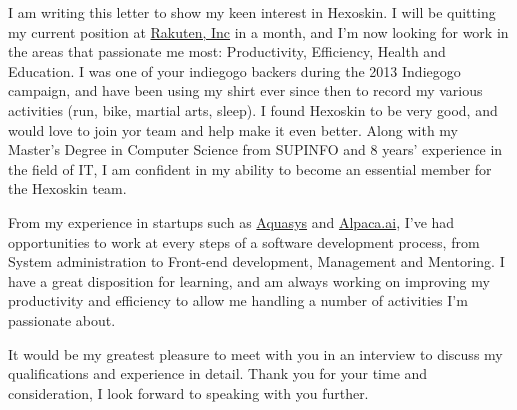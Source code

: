 \documentclass[10pt,stdletter,dateno,sigleft]{newlfm} %
\begin{document}
\begin{newlfm}


I am writing this letter to show my keen interest in Hexoskin. I will be
quitting my current position at \href{http://global.rakuten.com/corp/}{Rakuten, Inc}
in a month, and I'm now looking for work in the areas that
passionate me most: Productivity, Efficiency, Health and Education. I was one of
your indiegogo backers during the 2013 Indiegogo campaign, and have been using
my shirt ever since then to record my various activities (run, bike, martial arts,
sleep). I found Hexoskin to be very good, and would love to join yor team and
help make it even better. Along with my Master's Degree in Computer Science from
SUPINFO and 8 years' experience in the field of IT, I am confident in my ability
to become an essential member for the Hexoskin team.

From my experience in startups such as
\href{http://www.aquasys.co.jp/}{Aquasys} and
\href{https://www.alpaca.ai/}{Alpaca.ai}, I've had opportunities to work at
every steps of a software development process, from System administration to
Front-end development, Management and Mentoring. I have a great disposition for
learning, and am always working on improving my productivity and efficiency to
allow me handling a number of activities I'm passionate about.

It would be my greatest pleasure to meet with you in an interview to discuss my
qualifications and experience in detail.  Thank you for your time and
consideration, I look forward to speaking with you further.


\end{newlfm}
\end{document}
